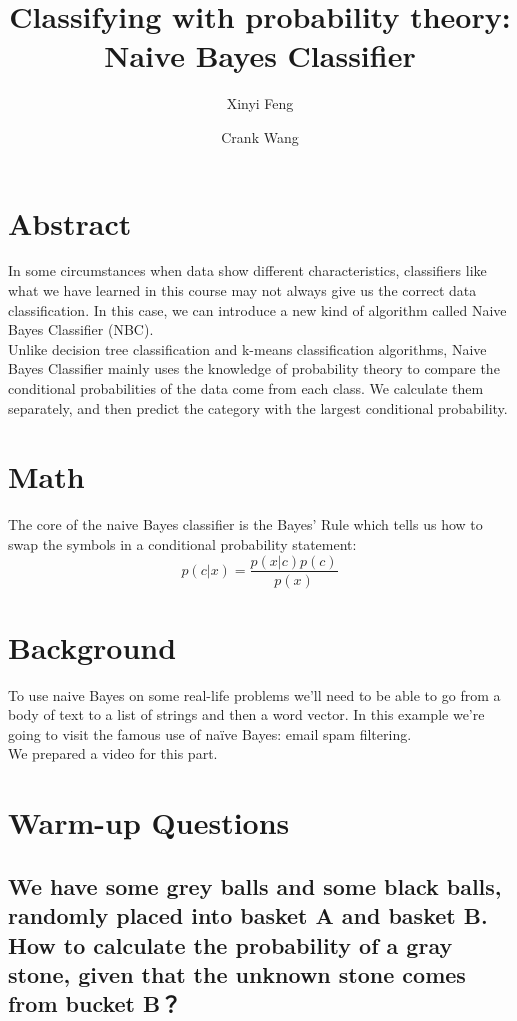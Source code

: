 \documentclass[11pt,a4paper]{article}
\title{Classifying with probability theory: Naive Bayes Classifier}
\author[a]{Xinyi Feng}
\author[b]{Crank Wang}
\affil[a]{xfeng82@wisc.edu}
\affil[b]{ywang2554@wisc.edu}
\date{}
\begin{document}
  \maketitle
  
\section{Abstract}
In some circumstances when data show different characteristics, classifiers
like what we have learned in this course may not always give us the correct
data classification. In this case, we can introduce a new kind of algorithm
called Naive Bayes Classifier (NBC).\\
Unlike decision tree classification and k-means classification algorithms, Naive Bayes Classifier mainly uses the knowledge of probability theory to compare the conditional probabilities of the data come from each class. We calculate them separately, and then predict the category with the largest conditional probability. 

\section{Math}
The core of the naive Bayes classifier is the Bayes' Rule which tells us how to swap the symbols in a conditional probability statement:
\begin{equation}
p(c|x)=\frac{p(x|c)p(c)}{p(x)}
\end{equation}
\section{Background}

To use naive Bayes on some real-life problems we’ll need to be able to go from a body of text to a list of strings and then a word vector. In this example we’re going to visit the famous use of naïve Bayes: email spam filtering.\\
We prepared a video for this part.

\section{Warm-up Questions}
\subsection{We have some grey balls and some black balls, randomly placed into basket A and basket B. How to calculate the probability of a gray stone, given that the unknown stone comes from bucket B？}
~\\~\\~\\~\\
\end{document}
